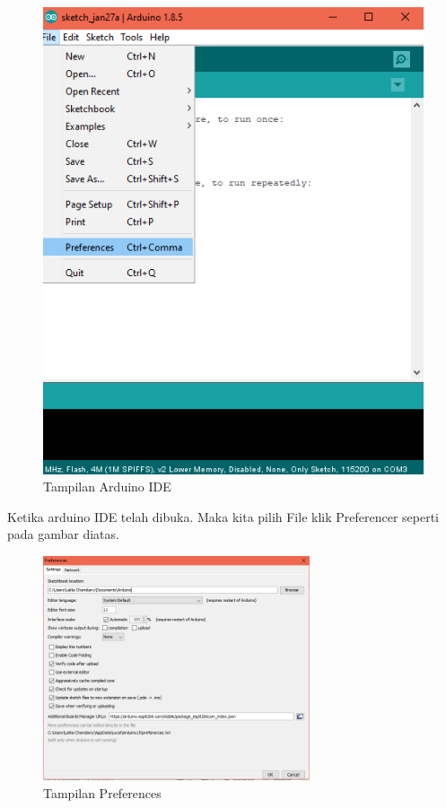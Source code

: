 \begin{enumerate}
    \begin{figure}[H]
    \centering
    \includegraphics[width=1\textwidth]{figures/managerpre.png}
    \caption{Tampilan Arduino IDE }
    \label{print}
    \end{figure}
    
    \par Ketika arduino IDE telah dibuka. Maka kita pilih File klik Preferencer seperti pada gambar diatas.
    \begin{figure}[H]
    \centering
    \includegraphics[width=0.7\textwidth]{figures/manager4.png}
    \caption{Tampilan Preferences}
    \label{print}
    \end{figure}
    

\end{enumerate}
